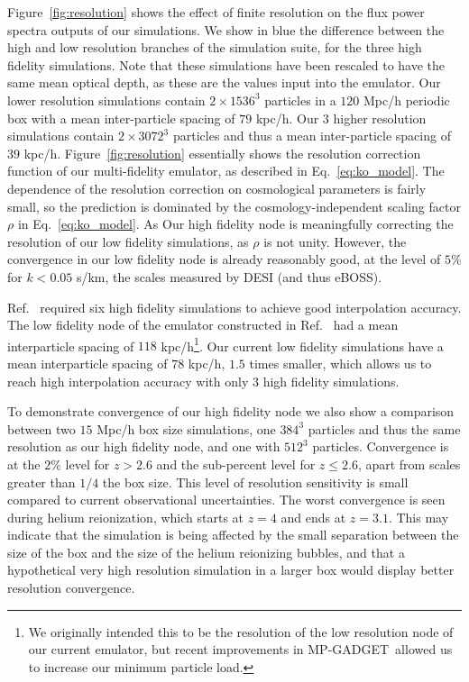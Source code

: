 \documentclass[a4paper,11pt]{article}
\newcommand{\mpgadget}{{\small MP-GADGET}}
\begin{document}
Figure~\ref{fig:resolution} shows the effect of finite resolution on the flux power spectra outputs of our simulations. We show in blue the difference between the high and low resolution branches of the simulation suite, for the three high fidelity simulations. Note that these simulations have been rescaled to have the same mean optical depth, as these are the values input into the emulator. Our lower resolution simulations contain $2\times 1536^3$ particles in a $120$ Mpc/h periodic box with a mean inter-particle spacing of $79$ kpc/h. Our $3$ higher resolution simulations contain $2\times 3072^3$ particles and thus a mean inter-particle spacing of $39$ kpc/h. Figure~\ref{fig:resolution} essentially shows the resolution correction function of our multi-fidelity emulator, as described in Eq.~\ref{eq:ko_model}. The dependence of the resolution correction on cosmological parameters is fairly small, so the prediction is dominated by the cosmology-independent scaling factor $\rho$ in Eq.~\ref{eq:ko_model}. As Our high fidelity node is meaningfully correcting the resolution of our low fidelity simulations, as $\rho$ is not unity.
However, the convergence in our low fidelity node is already reasonably good, at the level of $5\%$ for $k < 0.05$ s/km, the scales measured by DESI (and thus eBOSS).

Ref.~\cite{Fernandez:2022} required six high fidelity simulations to achieve good interpolation accuracy. The low fidelity node of the emulator constructed in Ref.~\cite{Fernandez:2022} had a mean interparticle spacing of $118$ kpc/h\footnote{We originally intended this to be the resolution of the low resolution node of our current emulator, but recent improvements in \mpgadget~allowed us to increase our minimum particle load.}. Our current low fidelity simulations have a mean interparticle spacing of $78$ kpc/h, $1.5$ times smaller, which allows us to reach high interpolation accuracy with only $3$ high fidelity simulations.

To demonstrate convergence of our high fidelity node we also show a comparison between two $15$ Mpc/h box size simulations, one $384^3$ particles and thus the same resolution as our high fidelity node, and one with $512^3$ particles. Convergence is at the $2\%$ level for $z > 2.6$ and the sub-percent level for $z \leq 2.6$, apart from scales greater than $1/4$ the box size. This level of resolution sensitivity is small compared to current observational uncertainties.
The worst convergence is seen during helium reionization, which starts at $z=4$ and ends at $z=3.1$. This may indicate that the simulation is being affected by the small separation between the size of the box and the size of the helium reionizing bubbles, and that a hypothetical very high resolution simulation in a larger box would display better resolution convergence.
\end{document}
